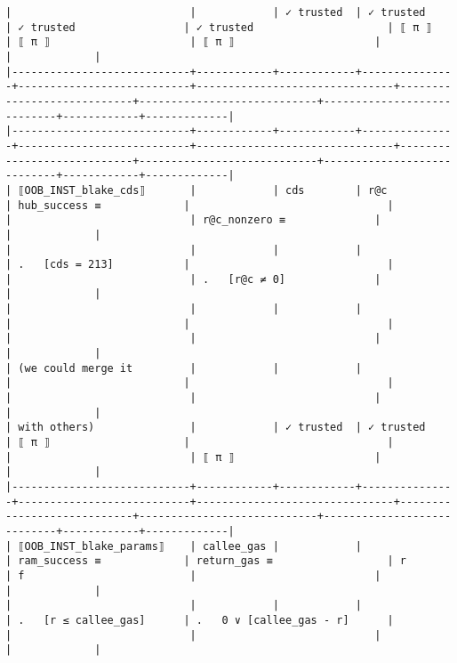 \documentclass[varwidth=\maxdimen,margin=0.5cm,multi={verbatim}]{standalone}
\begin{document}
\begin{verbatim}
|                            |            | ✓ trusted  | ✓ trusted     | ✓ trusted                 | ✓ trusted                     | ⟦ π ⟧                      | ⟦ π ⟧                      | ⟦ π ⟧                      |            |             |
|----------------------------+------------+------------+---------------+---------------------------+-------------------------------+----------------------------+----------------------------+----------------------------+------------+-------------|
|----------------------------+------------+------------+---------------+---------------------------+-------------------------------+----------------------------+----------------------------+----------------------------+------------+-------------|
| ⟦OOB_INST_blake_cds⟧       |            | cds        | r@c           | hub_success ≡             |                               |                            |                            | r@c_nonzero ≡              |            |             |
|                            |            |            |               | .   [cds = 213]           |                               |                            |                            | .   [r@c ≠ 0]              |            |             |
|                            |            |            |               |                           |                               |                            |                            |                            |            |             |
| (we could merge it         |            |            |               |                           |                               |                            |                            |                            |            |             |
| with others)               |            | ✓ trusted  | ✓ trusted     | ⟦ π ⟧                     |                               |                            |                            | ⟦ π ⟧                      |            |             |
|----------------------------+------------+------------+---------------+---------------------------+-------------------------------+----------------------------+----------------------------+----------------------------+------------+-------------|
| ⟦OOB_INST_blake_params⟧    | callee_gas |            |               | ram_success ≡             | return_gas ≡                  | r                          | f                          |                            |            |             |
|                            |            |            |               | .   [r ≤ callee_gas]      | .   0 ∨ [callee_gas - r]      |                            |                            |                            |            |             |

\end{verbatim}
\end{document}
